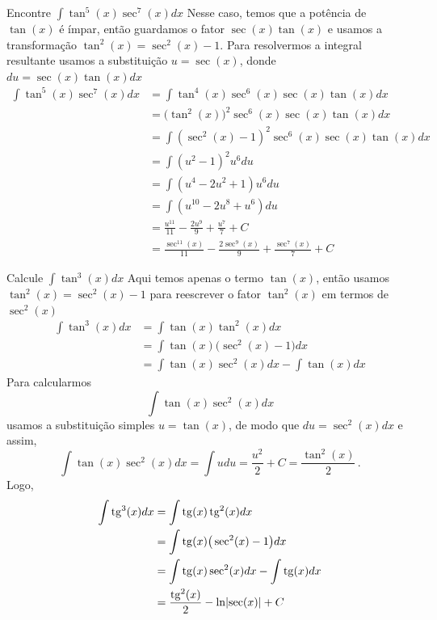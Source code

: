 \begin{example}
  Encontre \(\int \tan^5(x) \sec^7(x) dx\)
  \solution
  Nesse caso, temos que a potência de $\tan(x)$ é ímpar, então guardamos
  o fator $\sec(x)\tan(x)$ e usamos a transformação
  $\tan^2(x)= \sec^2(x)-1$.
  Para resolvermos a integral resultante usamos a substituição
  $u= \sec(x)$, donde $du= \sec(x)\tan(x)dx$
  \begin{align*}
    \int \tan^5(x) \sec^7(x) dx
    & = \int \tan^4(x) \sec^6(x) \sec(x) \tan(x) dx \\
    & = \big(\tan^2(x)\big)^2 \sec^6(x) \sec(x) \tan(x) dx \\
    & = \int (\sec^2(x)-1)^2\sec^6(x) \sec(x) \tan(x) dx \\
    & = \int (u^2-1)^2 u^6 du \\
    & = \int (u^4-2u^2+1)u^6 du \\
    & = \int (u^{10}-2u^8+u^6 )du \\
    & = \frac{u^{11}}{11}-\frac{2u^9}{9}+ \frac{u^7}{7}+C \\
    & = \frac{\sec^{11}(x)}{11}-\frac{2\sec^9(x)}{9}+ \frac{\sec^7(x)}{7}+C
  \end{align*}
\end{example}

\begin{example}
  Calcule \(\int \tan^3(x) dx\)
  \solution
  Aqui temos apenas o termo $\tan(x)$, então usamos
  $\tan^2(x)= \sec^2(x)-1$ para reescrever o fator
  $\tan^2(x)$ em termos de $\sec^2(x)$
  \begin{align*}
    \int \tan^3(x) dx
    & = \int \tan(x) \tan^2(x) dx \\
    & = \int \tan(x)\big(\sec^2(x)-1\big) dx \\
    & = \int \tan(x)\sec^2(x) dx- \int \tan(x) dx
  \end{align*}
  Para calcularmos
  \[
    \int \tan(x)\sec^2(x) dx
  \]
  usamos a substituição simples $u=\tan(x)$,
  de modo que $du= \sec^2(x)dx$ e assim,
  \[
    \int \tan(x)\sec^2(x) dx
    = \int udu
    = \frac{u^2}{2}+ C
    = \frac{\tan^2(x)}{2} \,.
  \]
  Logo,
  \begin{align*}
    \int \tan^3(x) dx
    & = \int \tan(x) \tan^2(x) dx \\
    & = \int \tan(x)\big(\sec^2(x)-1\big)dx \\
    & = \int \tan(x)\sec^2(x) dx- \int \tan(x) dx \\
    & = \frac{\tan^2(x)}{2}- \ln\abs{\sec(x)}+C
  \end{align*}
\end{example}

